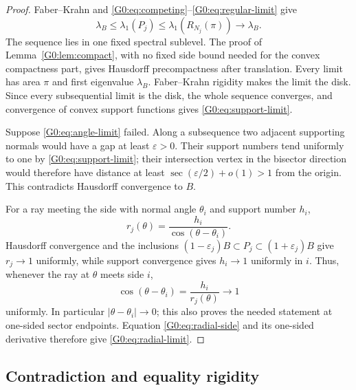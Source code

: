 \begin{proof}
Faber--Krahn and \eqref{G0:eq:competing}--\eqref{G0:eq:regular-limit} give
\[
 \lambda_B\le\lambda_1(P_j)
 \le\lambda_1(R_{N_j}(\pi))\longrightarrow\lambda_B.
\]
The sequence lies in one fixed spectral sublevel.  The proof of
Lemma~\ref{G0:lem:compact}, with no fixed side bound needed for the convex
compactness part, gives Hausdorff precompactness after translation.
Every limit has area $\pi$ and first eigenvalue $\lambda_B$.
Faber--Krahn rigidity makes the limit the disk.  Since every subsequential
limit is the disk, the whole sequence converges, and convergence of convex
support functions gives \eqref{G0:eq:support-limit}.

Suppose \eqref{G0:eq:angle-limit} failed.  Along a subsequence two adjacent
supporting normals would have a gap at least $\varepsilon>0$.  Their
support numbers tend uniformly to one by \eqref{G0:eq:support-limit}; their
intersection vertex in the bisector direction would therefore have
distance at least $\sec(\varepsilon/2)+o(1)>1$ from the origin.  This
contradicts Hausdorff convergence to $B$.

For a ray meeting the side with normal angle $\theta_i$ and support
number $h_i$,
\begin{equation}\label{G0:eq:radial-side}
 r_j(\theta)=\frac{h_i}{\cos(\theta-\theta_i)}.
\end{equation}
Hausdorff convergence and the inclusions
$(1-\varepsilon_j)B\subset P_j\subset(1+\varepsilon_j)B$ give
$r_j\to1$ uniformly, while support convergence gives $h_i\to1$
uniformly in $i$.  Thus, whenever the ray at $\theta$ meets side $i$,
\[
 \cos(\theta-\theta_i)=\frac{h_i}{r_j(\theta)}\longrightarrow1
\]
uniformly.  In particular $|\theta-\theta_i|\to0$; this also proves the
needed statement at one-sided sector endpoints.  Equation
\eqref{G0:eq:radial-side} and its one-sided derivative therefore give
\eqref{G0:eq:radial-limit}.
\end{proof}

\subsection{Contradiction and equality rigidity}


